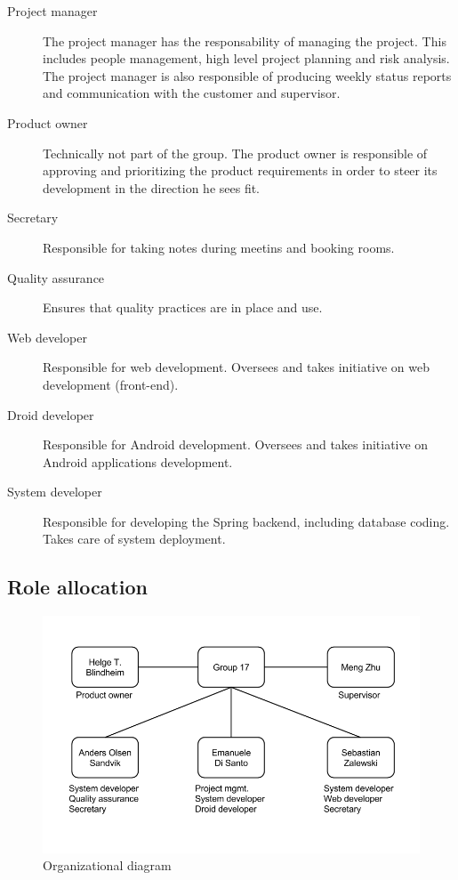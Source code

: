 \begin{description}
\item[Project manager]
The project manager has the responsability of managing the project.
This includes people management, high level project planning and risk analysis.
The project manager is also responsible of producing weekly status reports and communication with the customer and supervisor.
\item[Product owner]
Technically not part of the group. The product owner is responsible of approving and prioritizing the product
requirements in order to steer its development in the direction he sees fit.
\item[Secretary]
Responsible for taking notes during meetins and booking rooms.
\item[Quality assurance]
Ensures that quality practices are in place and use.
\item[Web developer]
Responsible for web development. Oversees and takes initiative on web development (front-end).
\item[Droid developer]
Responsible for Android development. Oversees and takes initiative on Android applications development.
\item[System developer]
Responsible for developing the Spring backend, including database coding. Takes care of system deployment.
\end{description}

\subsection{Role allocation}

\begin{figure}[H]
\includegraphics[scale=0.5]{../Figures/organizational-diagram.png}
\caption{Organizational diagram}
\label{figure:orgdia}
\end{figure}

